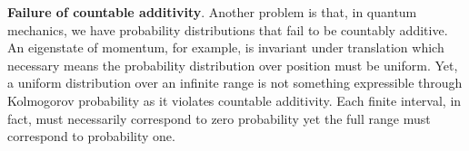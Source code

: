 \documentclass[10pt,twocolumn, nofootinbib]{revtex4-2}
\begin{document}
\textbf{Failure of countable additivity}. Another problem is that, in quantum mechanics, we have probability distributions that fail to be countably additive. An eigenstate of momentum, for example, is invariant under translation which necessary means the probability distribution over position must be uniform. Yet, a uniform distribution over an infinite range is not something expressible through Kolmogorov probability as it violates countable additivity. Each finite interval, in fact, must necessarily correspond to zero probability yet the full range must correspond to probability one.



\end{document}
